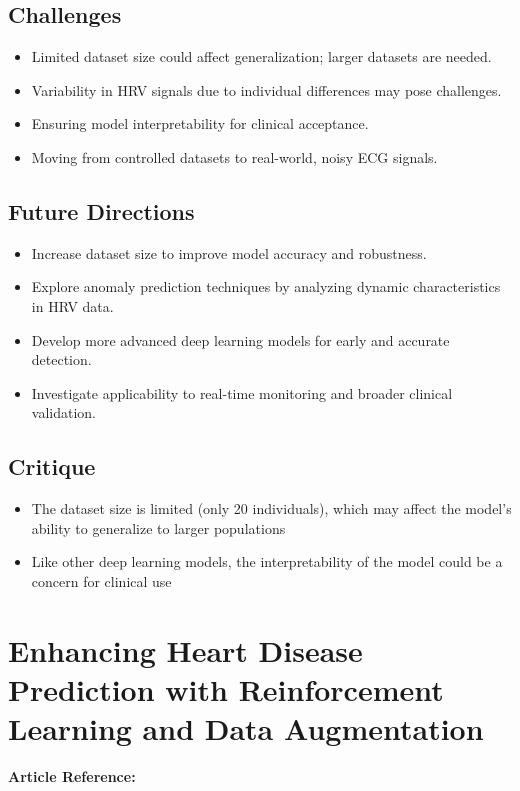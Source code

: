 \subsection*{Challenges}
\begin{itemize}
    \item Limited dataset size could affect generalization; larger datasets are needed.
    \item Variability in HRV signals due to individual differences may pose challenges.
    \item Ensuring model interpretability for clinical acceptance.
    \item Moving from controlled datasets to real-world, noisy ECG signals.
\end{itemize}

\subsection*{Future Directions}
\begin{itemize}
    \item Increase dataset size to improve model accuracy and robustness.
    \item Explore anomaly prediction techniques by analyzing dynamic characteristics in HRV data.
    \item Develop more advanced deep learning models for early and accurate detection.
    \item Investigate applicability to real-time monitoring and broader clinical validation.
\end{itemize}

\subsection*{Critique}
\begin{itemize}
    \item The dataset size is limited (only 20 individuals), which may affect the model's ability to generalize to larger populations
    \item Like other deep learning models, the interpretability of the model could be a concern for clinical use
\end{itemize}

\section{Enhancing Heart Disease Prediction with Reinforcement Learning and Data Augmentation}
\textbf{Article Reference:} \cite{article_5}

